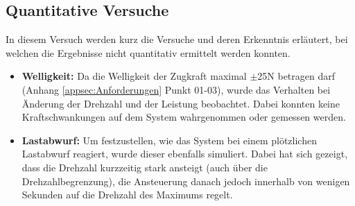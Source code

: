 \subsection{Quantitative Versuche}\label{subsec:Quantitative}
In diesem Versuch werden kurz die Versuche und deren Erkenntnis erläutert, bei welchen die Ergebnisse nicht quantitativ ermittelt werden konnten.
\begin{itemize}
	\item \textbf{Welligkeit:} Da die Welligkeit der Zugkraft maximal $\pm$25N betragen darf (Anhang \ref{appsec:Anforderungen} Punkt 01-03), wurde das Verhalten bei Änderung der Drehzahl und der Leistung beobachtet. Dabei konnten keine Kraftschwankungen auf dem System wahrgenommen oder gemessen werden.
	\item \textbf{Lastabwurf:} Um festzustellen, wie das System bei einem plötzlichen Lastabwurf reagiert, wurde dieser ebenfalls simuliert. Dabei hat sich gezeigt, dass die Drehzahl kurzzeitig stark ansteigt (auch über die Drehzahlbegrenzung), die Ansteuerung danach jedoch innerhalb von wenigen Sekunden auf die Drehzahl des Maximums regelt.
\end{itemize}